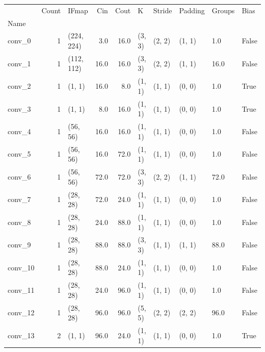 \begin{center}
    \begin{table}[]
    \begin{tabular}{lrlrrlllll}
        \toprule
        {} &  Count &       IFmap &    Cin &    Cout &       K &  Stride & Padding & Groups &   Bias \\
        Name    &        &             &        &         &         &         &         &        &        \\
        \midrule
        conv\_0  &      1 &  (224, 224) &    3.0 &    16.0 &  (3, 3) &  (2, 2) &  (1, 1) &    1.0 &  False \\
        conv\_1  &      1 &  (112, 112) &   16.0 &    16.0 &  (3, 3) &  (2, 2) &  (1, 1) &   16.0 &  False \\
        conv\_2  &      1 &      (1, 1) &   16.0 &     8.0 &  (1, 1) &  (1, 1) &  (0, 0) &    1.0 &   True \\
        conv\_3  &      1 &      (1, 1) &    8.0 &    16.0 &  (1, 1) &  (1, 1) &  (0, 0) &    1.0 &   True \\
        conv\_4  &      1 &    (56, 56) &   16.0 &    16.0 &  (1, 1) &  (1, 1) &  (0, 0) &    1.0 &  False \\
        conv\_5  &      1 &    (56, 56) &   16.0 &    72.0 &  (1, 1) &  (1, 1) &  (0, 0) &    1.0 &  False \\
        conv\_6  &      1 &    (56, 56) &   72.0 &    72.0 &  (3, 3) &  (2, 2) &  (1, 1) &   72.0 &  False \\
        conv\_7  &      1 &    (28, 28) &   72.0 &    24.0 &  (1, 1) &  (1, 1) &  (0, 0) &    1.0 &  False \\
        conv\_8  &      1 &    (28, 28) &   24.0 &    88.0 &  (1, 1) &  (1, 1) &  (0, 0) &    1.0 &  False \\
        conv\_9  &      1 &    (28, 28) &   88.0 &    88.0 &  (3, 3) &  (1, 1) &  (1, 1) &   88.0 &  False \\
        conv\_10 &      1 &    (28, 28) &   88.0 &    24.0 &  (1, 1) &  (1, 1) &  (0, 0) &    1.0 &  False \\
        conv\_11 &      1 &    (28, 28) &   24.0 &    96.0 &  (1, 1) &  (1, 1) &  (0, 0) &    1.0 &  False \\
        conv\_12 &      1 &    (28, 28) &   96.0 &    96.0 &  (5, 5) &  (2, 2) &  (2, 2) &   96.0 &  False \\
        conv\_13 &      2 &      (1, 1) &   96.0 &    24.0 &  (1, 1) &  (1, 1) &  (0, 0) &    1.0 &   True \\

\end{tabular}
\end{table}
\end{center}

